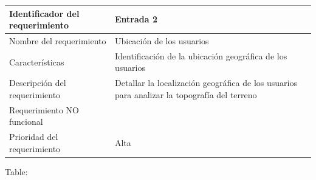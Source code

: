 \documentclass[]{article}
\begin{document}
\begin{longtable}[]{@{}ll@{}}
\toprule
\begin{minipage}[b]{0.39\columnwidth}\raggedright\strut
Identificador del requerimiento\strut
\end{minipage} & \begin{minipage}[b]{0.50\columnwidth}\raggedright\strut
Entrada 2\strut
\end{minipage}\tabularnewline
\midrule
\endhead
\begin{minipage}[t]{0.39\columnwidth}\raggedright\strut
Nombre del requerimiento\strut
\end{minipage} & \begin{minipage}[t]{0.50\columnwidth}\raggedright\strut
Ubicación de los usuarios\strut
\end{minipage}\tabularnewline
\begin{minipage}[t]{0.39\columnwidth}\raggedright\strut
Características\strut
\end{minipage} & \begin{minipage}[t]{0.50\columnwidth}\raggedright\strut
Identificación de la ubicación geográfica de los usuarios\strut
\end{minipage}\tabularnewline
\begin{minipage}[t]{0.39\columnwidth}\raggedright\strut
Descripción del requerimiento\strut
\end{minipage} & \begin{minipage}[t]{0.50\columnwidth}\raggedright\strut
Detallar la localización geográfica de los usuarios para analizar la
topografía del terreno\strut
\end{minipage}\tabularnewline
\begin{minipage}[t]{0.39\columnwidth}\raggedright\strut
Requerimiento NO funcional\strut
\end{minipage} & \begin{minipage}[t]{0.50\columnwidth}\raggedright\strut
\strut
\end{minipage}\tabularnewline
\begin{minipage}[t]{0.39\columnwidth}\raggedright\strut
Prioridad del requerimiento\strut
\end{minipage} & \begin{minipage}[t]{0.50\columnwidth}\raggedright\strut
Alta\strut
\end{minipage}\tabularnewline
\bottomrule
\end{longtable}

Table:
\end{document}
